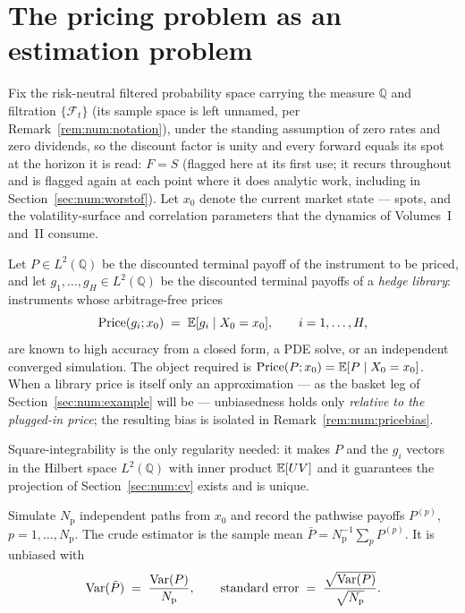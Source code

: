 \section{The pricing problem as an estimation problem}
\label{sec:num:setup}

Fix the risk-neutral filtered probability space carrying the measure
$\mathbb{Q}$ and filtration $\{\mathcal{F}_t\}$ (its sample space is left
unnamed, per Remark~\ref{rem:num:notation}), under the standing assumption of
zero rates and zero dividends, so the discount factor is unity and every forward
equals its spot at the horizon it is read: $F = S$ (flagged here at its first
use; it recurs throughout and is flagged again at each point where it does
analytic work, including in Section~\ref{sec:num:worstof}). Let
$x_0$ denote the current market state --- spots, and the volatility-surface and
correlation parameters that the dynamics of Volumes~I and~II consume.

\begin{definition}\label{def:num:payoffs}
Let $P \in L^2(\mathbb{Q})$ be the discounted terminal payoff of the instrument
to be priced, and let $g_1,\dots,g_H \in L^2(\mathbb{Q})$ be the discounted
terminal payoffs of a \emph{hedge library}: instruments whose arbitrage-free
prices
\[
   \mathrm{Price}(g_i; x_0) \;=\; \mathbb{E}[g_i \mid X_0 = x_0], \qquad i = 1,\dots,H,
\]
are known to high accuracy from a closed form, a PDE solve, or an independent
converged simulation. The object required is
$\mathrm{Price}(P; x_0) = \mathbb{E}[P \mid X_0 = x_0]$. When a library price is itself
only an approximation --- as the basket leg of Section~\ref{sec:num:example}
will be --- unbiasedness holds only \emph{relative to the plugged-in price}; the
resulting bias is isolated in Remark~\ref{rem:num:pricebias}.
\end{definition}

Square-integrability is the only regularity needed: it makes $P$ and the $g_i$
vectors in the Hilbert space $L^2(\mathbb{Q})$ with inner product $\mathbb{E}[UV]$ and it
guarantees the projection of Section~\ref{sec:num:cv} exists and is unique.

\begin{definition}\label{def:num:crude}
Simulate $N_{\mathrm{p}}$ independent paths from $x_0$ and record the pathwise payoffs
$P^{(p)}$, $p = 1,\dots,N_{\mathrm{p}}$. The crude estimator is the sample mean
$\bar P = N_{\mathrm{p}}^{-1}\sum_{p} P^{(p)}$. It is unbiased with
\[
   \operatorname{Var}(\bar P) \;=\; \frac{\operatorname{Var}(P)}{N_{\mathrm{p}}},
   \qquad
   \text{standard error} \;=\; \frac{\sqrt{\operatorname{Var}(P)}}{\sqrt{N_{\mathrm{p}}}}.
\]
\end{definition}

